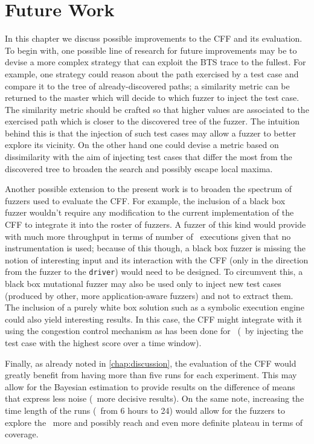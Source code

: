 \chapter{Future Work}
\label{chap:future}

In this chapter we discuss possible improvements to the \ac{CFF} and its
evaluation. To begin with, one possible line of research for future improvements
may be to devise a more complex strategy that can exploit the \ac{BTS} trace to
the fullest. For example, one strategy could reason about the path exercised by
a test case and compare it to the tree of already-discovered paths; a similarity
metric can be returned to the master which will decide to which fuzzer to inject
the test case. The similarity metric should be crafted so that higher values are
associated to the exercised path which is closer to the discovered tree of the
fuzzer. The intuition behind this is that the injection of such test cases may
allow a fuzzer to better explore its vicinity. On the other hand one could
devise a metric based on dissimilarity with the aim of injecting test cases that
differ the most from the discovered tree to broaden the search and possibly
escape local maxima.

Another possible extension to the present work is to broaden the spectrum of
fuzzers used to evaluate the \ac{CFF}. For example, the inclusion of a black box
fuzzer wouldn't require any modification to the current implementation of the
\ac{CFF} to integrate it into the roster of fuzzers. A fuzzer of this kind would
provide with much more throughput in terms of number of \sut\ executions given
that no instrumentation is used; because of this though, a black box fuzzer is
missing the notion of interesting input and its interaction with the \ac{CFF}
(only in the direction from the fuzzer to the \texttt{driver}) would need to be
designed. To circumvent this, a black box mutational fuzzer may also be used
only to inject new test cases (produced by other, more application-aware
fuzzers) and not to extract them. The inclusion of a purely white box solution
such as a symbolic execution engine could also yield interesting results. In
this case, the \ac{CFF} might integrate with it using the congestion control
mechanism as has been done for \vuzzer\ (\ie~by injecting the test case with the
highest score over a time window).

Finally, as already noted in \autoref{chap:discussion}, the evaluation of the
\ac{CFF} would greatly benefit from having more than five runs for each
experiment. This may allow for the Bayesian estimation to provide results on the
difference of means that express less noise (\ie~more decisive results). On the
same note, increasing the time length of the runs (\eg~from 6 hours to 24) would
allow for the fuzzers to explore the \sut\ more and possibly reach and even more
definite plateau in terms of coverage.

